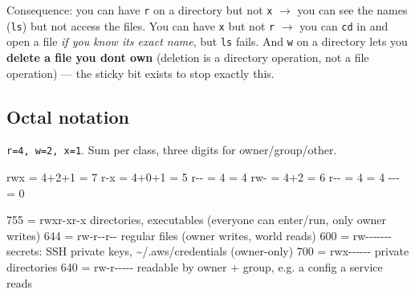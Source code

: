 \documentclass[11pt]{article}
\newenvironment{Shaded}{\begin{snugshade}}{\end{snugshade}}
\newcommand{\DecValTok}[1]{\textcolor[rgb]{0.96,0.45,0.00}{#1}}
\newcommand{\NormalTok}[1]{\textcolor[rgb]{0.81,0.81,0.76}{#1}}
\newcommand{\OperatorTok}[1]{\textcolor[rgb]{0.81,0.81,0.76}{#1}}
\begin{document}
Consequence: you can have \texttt{r} on a directory but not \texttt{x} \(\rightarrow\) you can see the names (\texttt{ls}) but not access the files. You can have \texttt{x} but not \texttt{r} \(\rightarrow\) you can \texttt{cd} in and open a file \emph{if you know its exact name}, but \texttt{ls} fails. And \texttt{w} on a directory lets you \textbf{delete a file you don\textquotesingle t own} (deletion is a directory operation, not a file operation) --- the sticky bit exists to stop exactly this.

\subsection{Octal notation}\label{octal-notation}

\texttt{r=4,\ w=2,\ x=1}. Sum per class, three digits for owner/group/other.


\begin{Shaded}
\begin{Highlighting}[]
\NormalTok{rwx }\OperatorTok{=} \DecValTok{4}\OperatorTok{+}\DecValTok{2}\OperatorTok{+}\DecValTok{1} \OperatorTok{=} \DecValTok{7}\NormalTok{      r}\OperatorTok{{-}}\NormalTok{x }\OperatorTok{=} \DecValTok{4}\OperatorTok{+}\DecValTok{0}\OperatorTok{+}\DecValTok{1} \OperatorTok{=} \DecValTok{5}\NormalTok{      r}\OperatorTok{{-}{-}} \OperatorTok{=} \DecValTok{4} \OperatorTok{=} \DecValTok{4}
\NormalTok{rw}\OperatorTok{{-}} \OperatorTok{=} \DecValTok{4}\OperatorTok{+}\DecValTok{2}   \OperatorTok{=} \DecValTok{6}\NormalTok{      r}\OperatorTok{{-}{-}} \OperatorTok{=} \DecValTok{4}     \OperatorTok{=} \DecValTok{4}      \OperatorTok{{-}{-}{-}} \OperatorTok{=} \DecValTok{0}

\DecValTok{755} \OperatorTok{=}\NormalTok{ rwxr}\OperatorTok{{-}}\NormalTok{xr}\OperatorTok{{-}}\NormalTok{x   directories, executables (everyone can enter}\OperatorTok{/}\NormalTok{run, only owner writes)}
\DecValTok{644} \OperatorTok{=}\NormalTok{ rw}\OperatorTok{{-}}\NormalTok{r}\OperatorTok{{-}{-}}\NormalTok{r}\OperatorTok{{-}{-}}\NormalTok{   regular files (owner writes, world reads)}
\DecValTok{600} \OperatorTok{=}\NormalTok{ rw}\OperatorTok{{-}{-}{-}{-}{-}{-}{-}}\NormalTok{   secrets: SSH private keys, }\OperatorTok{\textasciitilde{}/}\NormalTok{.aws}\OperatorTok{/}\NormalTok{credentials (owner}\OperatorTok{{-}}\NormalTok{only)}
\DecValTok{700} \OperatorTok{=}\NormalTok{ rwx}\OperatorTok{{-}{-}{-}{-}{-}{-}}\NormalTok{   private directories}
\DecValTok{640} \OperatorTok{=}\NormalTok{ rw}\OperatorTok{{-}}\NormalTok{r}\OperatorTok{{-}{-}{-}{-}{-}}\NormalTok{   readable by owner }\OperatorTok{+}\NormalTok{ group, e.g. a config a service reads}
\end{Highlighting}
\end{Shaded}
\end{document}
